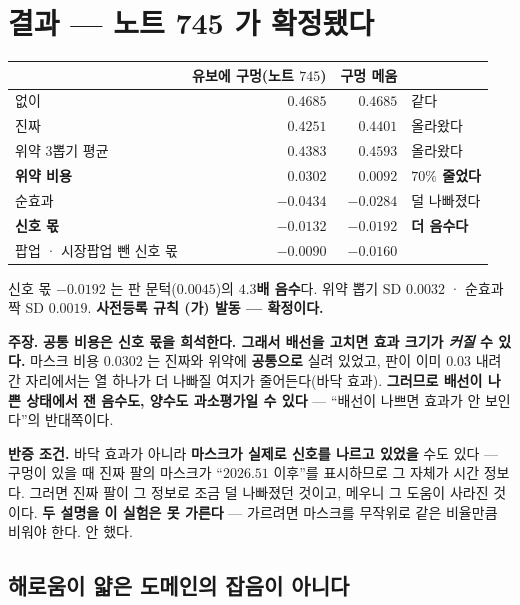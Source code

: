 \documentclass[10pt,a4paper]{article}
\newcommand{\claim}[2]{\begin{claimbox}\textbf{주장.} #1\par\smallskip
  \textcolor{gray!70}{\textbf{반증 조건.} #2}\end{claimbox}}
\begin{document}
\section{결과 --- 노트 745 가 확정됐다}

\begin{center}
\begin{tabular}{lrrl}
\toprule
& 유보에 구멍(노트 $745$) & \textbf{구멍 메움} & \\
\midrule
없이 & $0.4685$ & $0.4685$ & 같다 \\
진짜 & $0.4251$ & $\mathbf{0.4401}$ & 올라왔다 \\
위약 $3$뽑기 평균 & $0.4383$ & $0.4593$ & 올라왔다 \\
\midrule
\textbf{위약 비용} & $0.0302$ & $\mathbf{0.0092}$ & \textbf{$70\%$ 줄었다} \\
순효과 & $-0.0434$ & $-0.0284$ & 덜 나빠졌다 \\
\textbf{신호 몫} & $-0.0132$ & $\mathbf{-0.0192}$ & \textbf{더 음수다} \\
팝업 · 시장팝업 뺀 신호 몫 & $-0.0090$ & $-0.0160$ & \\
\bottomrule
\end{tabular}
\end{center}

신호 몫 $-0.0192$ 는 판 문턱($0.0045$)의 \textbf{$4.3$배 음수}다. 위약 뽑기 SD
$0.0032$ · 순효과 짝 SD $0.0019$. \textbf{사전등록 규칙 (가) 발동 --- 확정이다.}

\claim{\textbf{공통 비용은 신호 몫을 희석한다. 그래서 배선을 고치면 효과 크기가
\emph{커질} 수 있다.} 마스크 비용 $0.0302$ 는 진짜와 위약에 \textbf{공통으로} 실려
있었고, 판이 이미 $0.03$ 내려간 자리에서는 열 하나가 더 나빠질 여지가 줄어든다(바닥
효과). \textbf{그러므로 배선이 나쁜 상태에서 잰 음수도, 양수도 과소평가일 수 있다} ---
``배선이 나쁘면 효과가 안 보인다''의 반대쪽이다.}
{바닥 효과가 아니라 \textbf{마스크가 실제로 신호를 나르고 있었을} 수도 있다 --- 구멍이
있을 때 진짜 팔의 마스크가 ``$2026.51$ 이후''를 표시하므로 그 자체가 시간 정보다. 그러면
진짜 팔이 그 정보로 조금 덜 나빠졌던 것이고, 메우니 그 도움이 사라진 것이다.
\textbf{두 설명을 이 실험은 못 가른다} --- 가르려면 마스크를 무작위로 같은 비율만큼
비워야 한다. 안 했다.}

\subsection*{해로움이 얇은 도메인의 잡음이 아니다}
\end{document}
